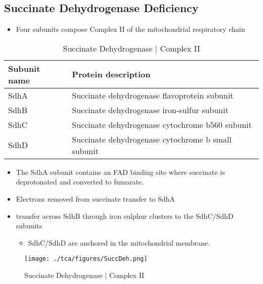 \documentclass{scrartcl}
\begin{document}
\subsection{Succinate Dehydrogenase Deficiency}
\label{sec:org3c23779}
\begin{itemize}
\item Four subunits compose Complex II of the mitochondrial respiratory chain
\end{itemize}

\begin{table}[htbp]
\caption{\label{tab:org9ce6080}
Succinate Dehydrogenase | Complex II}
\centering
\begin{tabular}{ll}
Subunit name & Protein description\\
\hline
SdhA & Succinate dehydrogenase flavoprotein subunit\\
SdhB & Succinate dehydrogenase iron-sulfur subunit\\
SdhC & Succinate dehydrogenase cytochrome b560 subunit\\
SdhD & Succinate dehydrogenase cytochrome b small subunit\\
\end{tabular}
\end{table}

\begin{itemize}
\item The SdhA subunit contains an FAD binding site where succinate
is deprotonated and converted to fumarate.
\end{itemize}


\begin{itemize}
\item Electrons removed from succinate transfer to SdhA
\item transfer across SdhB through iron sulphur clusters to the SdhC/SdhD subunits
\begin{itemize}
\item SdhC/SdhD are anchored in the mitochondrial membrane.
\end{itemize}
\end{itemize}

\begin{figure}[htbp]
\centering
\texttt{[image: ./tca/figures/SuccDeh.png]}
\caption{\label{fig:orgacf1bd3}
Succinate Dehydrogenase | Complex II}
\end{figure}
\end{document}
